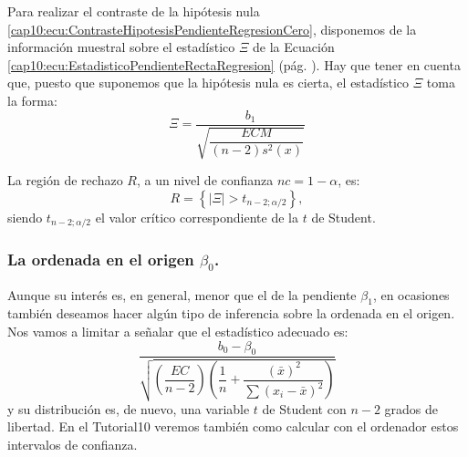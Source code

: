 Para realizar el contraste de la hipótesis nula \ref{cap10:ecu:ContrasteHipotesisPendienteRegresionCero}, disponemos de la información muestral sobre el estadístico $\Xi$ de la Ecuación \ref{cap10:ecu:EstadisticoPendienteRectaRegresion} (pág. \pageref{cap10:ecu:EstadisticoPendienteRectaRegresion}). Hay que tener en cuenta que, puesto que suponemos que la hipótesis nula es cierta, el estadístico $\Xi$ toma la forma:
\begin{equation}
\label{cap10:ecu:EstadisticoPendienteRectaRegresionContrasteIgualCero}
    \Xi=\dfrac{b_1}{\sqrt{\dfrac{ECM}{(n-2)s^2(x)}}}
\end{equation}

    \begin{center}
    \end{center}
La región de rechazo $R$, a un nivel de confianza $nc=1-\alpha$, es:
        \[R=\left\{\left|\Xi\right|>t_{n-2;\alpha/2}\right\},\]
siendo $t_{n-2;\alpha/2}$ el valor crítico correspondiente de la $t$ de Student.


\subsubsection*{La ordenada en el origen $\beta_0$.}

Aunque su interés es, en general, menor que el de la pendiente $\beta_1$, en ocasiones también deseamos hacer algún tipo de inferencia sobre la ordenada en el origen. Nos vamos a limitar a señalar que el estadístico adecuado es:
    \begin{equation}\label{cap10:ecu:EstadisticoOrdenadaOrigenRectaRegresion}
    \dfrac{b_0-\beta_0}{
    \sqrt{
    \left(\dfrac{EC}{n-2}\right)
    \left(\dfrac{1}{n}+\dfrac{(\bar x)^2}{\sum(x_i-\bar x)^2}\right)
    }}
    \end{equation}
y su distribución es, de nuevo, una variable $t$ de Student con $n-2$ grados de libertad. En el Tutorial10 veremos también como calcular con el ordenador estos intervalos de confianza.

